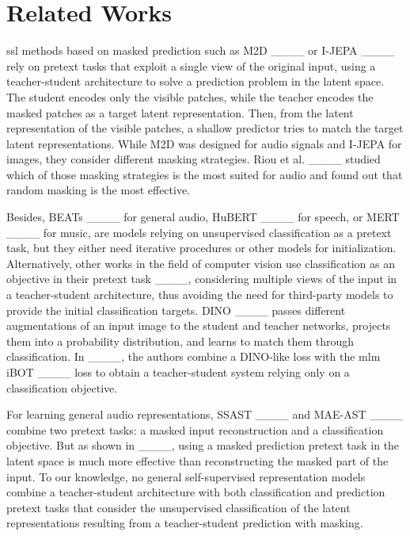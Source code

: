 \section{Related Works}
\ac{ssl} methods based on masked prediction such as M2D ____ or I-JEPA ____ rely on pretext tasks that exploit a single view of the original input, using a teacher-student architecture to solve a prediction problem in the latent space. 
The student encodes only the visible patches, while the teacher encodes the masked patches as a target latent representation. 
Then, from the latent representation of the visible patches, a shallow predictor tries to match the target latent representations.
While M2D was designed for audio signals and I-JEPA for images, they consider different masking strategies. 
Riou et al. ____ studied which of those masking strategies is the most suited for audio and found out that random masking is the most effective.

Besides, BEATs ____ for general audio, HuBERT ____ for speech, or MERT ____ for music, are models relying on unsupervised classification as a pretext task, but they either need iterative procedures or other models for initialization. 
Alternatively, other works in the field of computer vision use classification as an objective in their pretext task ____, considering multiple views of the input in a teacher-student architecture, thus avoiding the need for third-party models to provide the initial classification targets.
DINO ____ passes different augmentations of an input image to the student and teacher networks, projects them into a probability distribution, and learns to match them through classification.
In ____, the authors combine a DINO-like loss with the \ac{mlm} iBOT ____ loss to obtain a teacher-student system relying only on a classification objective. 

For learning general audio representations, SSAST ____ and MAE-AST ____ combine two pretext tasks: a masked input reconstruction and a classification objective. 
But as shown in ____, using a masked prediction pretext task in the latent space is much more effective than reconstructing the masked part of the input. To our knowledge, no general self-supervised representation models combine a teacher-student architecture with both classification and prediction pretext tasks that consider the unsupervised classification of the latent representations resulting from a teacher-student prediction with masking.

